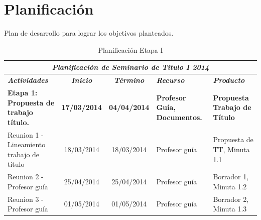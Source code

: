 \documentclass[12pt,letterpaper]{article}
\begin{document}
\newpage
\clearpage

\section{Planificaci\'on}
\label{plan}

Plan de desarrollo para lograr los objetivos planteados.


\begin{table}[htf]
\begin{tabular}{| p{4cm} | c | c | p{3cm}  | p{2.5cm} |}
\hline

\multicolumn{5}{|c|}{\textbf{\textit{Planificaci\'on de Seminario de T\'itulo I 2014}}} \\ \hline \hline
\textit{\textbf{Actividades}} & 
\textit{\textbf{Inicio}} & 
\textit{\textbf{T\'ermino}} & 
\centering \textit{\textbf{Recurso}} & 
\textit{\textbf{Producto}} \\ \hline \hline
\textbf{Etapa 1: Propuesta de trabajo t\'itulo.} & 
\textbf{17/03/2014} & 
\textbf{04/04/2014} & 
\textbf{Profesor Gu\'ia, Documentos.} & 
\textbf{Propuesta Trabajo de T\'itulo} \\ \hline


Reunion 1 - Lineamiento trabajo de t\'itulo& 
18/03/2014 & 
18/03/2014 &  
Profesor gu\'ia & 
Propuesta de TT, Minuta 1.1 \\ \hline

Reunion 2 - Profesor gu\'ia & 
25/04/2014 & 
25/04/2014 &  
Profesor gu\'ia & 
Borrador 1, Minuta 1.2\\ \hline

Reunion 3 - Profesor gu\'ia & 
01/05/2014 & 
01/05/2014 &  
Profesor gu\'ia & 
Borrador 2, Minuta 1.3 \\ \hline


\hline
\end{tabular}
\caption{Planificaci\'on Etapa I}
\end{table}





\end{document}
